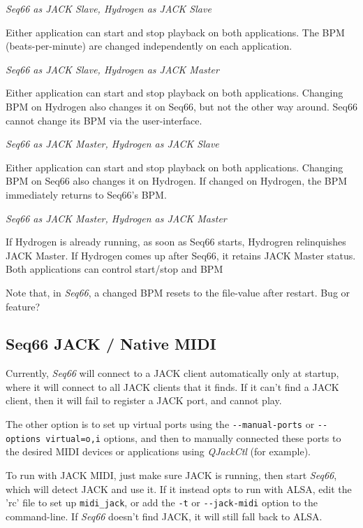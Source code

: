   \textsl{Seq66 as JACK Slave, Hydrogen as JACK Slave}

      Either application can start and stop playback on both applications.
      The BPM (beats-per-minute) are changed independently on each application.

   \textsl{Seq66 as JACK Slave, Hydrogen as JACK Master}

      Either application can start and stop playback on both applications.
      Changing BPM on Hydrogen also changes it on Seq66, but not the other way
      around. Seq66 cannot change its BPM via the user-interface.

   \textsl{Seq66 as JACK Master, Hydrogen as JACK Slave}

      Either application can start and stop playback on both applications.
      Changing BPM on Seq66 also changes it on Hydrogen.  If changed on Hydrogen,
      the BPM immediately returns to Seq66's BPM.

   \textsl{Seq66 as JACK Master, Hydrogen as JACK Master}

      If Hydrogen is already running, as soon as Seq66 starts, Hydrogren
      relinquishes JACK Master.
      If Hydrogen comes up after Seq66, it retains JACK Master status.  Both
      applications can control start/stop and BPM

   Note that, in \textsl{Seq66}, a changed BPM resets to the file-value after
   restart.  Bug or feature?

\subsection{Seq66 JACK / Native MIDI}
\label{subsec:jack_native_midi}

   Currently, \textsl{Seq66} will connect to a JACK
   client automatically only at startup, where it will connect to all JACK
   clients that it finds.  If it can't find a JACK client, then it will
   fail to register a JACK port, and cannot play.

   The other option is to set up virtual ports using the
   \texttt{-{}-manual-ports} or \texttt{-{}-options virtual=o,i} options, and then
   to manually connected these ports to the desired MIDI devices or
   applications using \textsl{QJackCtl} (for example).

   To run with JACK MIDI, just make sure JACK is running, then start
   \textsl{Seq66}, which will detect JACK and use it.
   If it instead opts to run with ALSA, edit the 'rc' file to set up
   \texttt{midi\_jack}, or add the
   \texttt{-t} or \texttt{-{}-jack-midi}
   option to the command-line.
   If \textsl{Seq66} doesn't find JACK, it will still fall back to ALSA.

